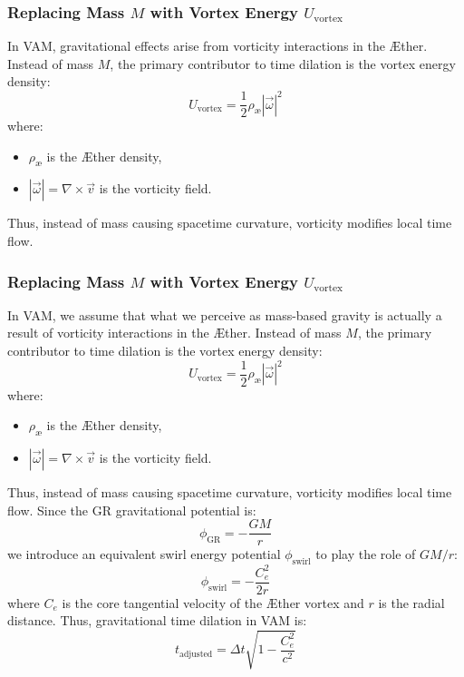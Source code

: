 \subsubsection*{Replacing Mass $M$ with Vortex Energy $U_{\text{vortex}}$}
In VAM, gravitational effects arise from vorticity interactions in the \AE ther. Instead of mass $M$, the primary contributor to time dilation is the vortex energy density:
\begin{equation}
    U_{\text{vortex}} = \frac{1}{2} \rho_{\text{\ae}} |\vec{\omega}|^2
\end{equation}
where:
\begin{itemize}
    \item $\rho_{\text{\ae}}$ is the \AE ther density,
    \item $|\vec{\omega}| = \nabla \times \vec{v}$ is the vorticity field.
\end{itemize}
Thus, instead of mass causing spacetime curvature, vorticity modifies local time flow.


\subsubsection*{Replacing Mass $M$ with Vortex Energy $U_{\text{vortex}}$}
In VAM, we assume that what we perceive as mass-based gravity is actually a result of vorticity interactions in the \AE ther. Instead of mass $M$, the primary contributor to time dilation is the vortex energy density:
\begin{equation}
    U_{\text{vortex}} = \frac{1}{2} \rho_{\text{\ae}} |\vec{\omega}|^2
\end{equation}
where:
\begin{itemize}
    \item $\rho_{\text{\ae}}$ is the \AE ther density,
    \item $|\vec{\omega}| = \nabla \times \vec{v}$ is the vorticity field.
\end{itemize}
Thus, instead of mass causing spacetime curvature, vorticity modifies local time flow. Since the GR gravitational potential is:
\begin{equation}
    \phi_{\text{GR}} = -\frac{GM}{r}
\end{equation}
we introduce an equivalent swirl energy potential $\phi_{\text{swirl}}$ to play the role of $GM/r$:
\begin{equation}
    \phi_{\text{swirl}} = -\frac{C_e^2}{2r}
\end{equation}
where $C_e$ is the core tangential velocity of the \AE ther vortex and $r$ is the radial distance. Thus, gravitational time dilation in VAM is:
\begin{equation}
    t_{\text{adjusted}} = \Delta t \sqrt{1 - \frac{C_e^2}{c^2}}
\end{equation}

